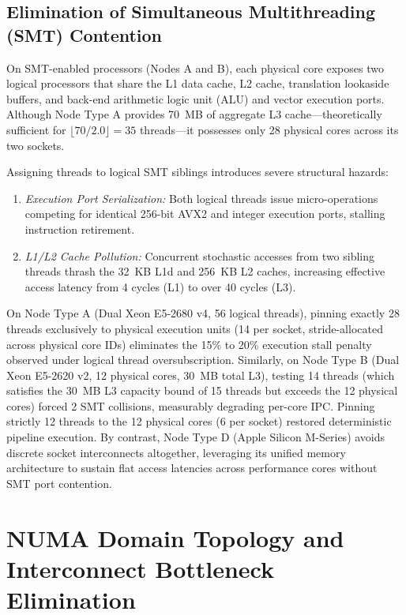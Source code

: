 \documentclass[journal]{IEEEtran}
\begin{document}
\subsection{Elimination of Simultaneous Multithreading (SMT) Contention}
On SMT-enabled processors (Nodes A and B), each physical core exposes two logical processors that share the L1 data cache, L2 cache, translation lookaside buffers, and back-end arithmetic logic unit (ALU) and vector execution ports. Although Node Type A provides 70~MB of aggregate L3 cache---theoretically sufficient for $\lfloor 70/2.0 \rfloor = 35$ threads---it possesses only 28 physical cores across its two sockets.

Assigning threads to logical SMT siblings introduces severe structural hazards:
\begin{enumerate}
\item \textit{Execution Port Serialization:} Both logical threads issue micro-operations competing for identical 256-bit AVX2 and integer execution ports, stalling instruction retirement.
\item \textit{L1/L2 Cache Pollution:} Concurrent stochastic accesses from two sibling threads thrash the 32~KB L1d and 256~KB L2 caches, increasing effective access latency from 4 cycles (L1) to over 40 cycles (L3).
\end{enumerate}

On Node Type A (Dual Xeon E5-2680 v4, 56 logical threads), pinning exactly 28 threads exclusively to physical execution units (14 per socket, stride-allocated across physical core IDs) eliminates the 15\% to 20\% execution stall penalty observed under logical thread oversubscription. Similarly, on Node Type B (Dual Xeon E5-2620 v2, 12 physical cores, 30~MB total L3), testing 14 threads (which satisfies the 30~MB L3 capacity bound of 15 threads but exceeds the 12 physical cores) forced 2 SMT collisions, measurably degrading per-core IPC. Pinning strictly 12 threads to the 12 physical cores (6 per socket) restored deterministic pipeline execution. By contrast, Node Type D (Apple Silicon M-Series) avoids discrete socket interconnects altogether, leveraging its unified memory architecture to sustain flat access latencies across performance cores without SMT port contention.

\section{NUMA Domain Topology and Interconnect Bottleneck Elimination}
\end{document}
